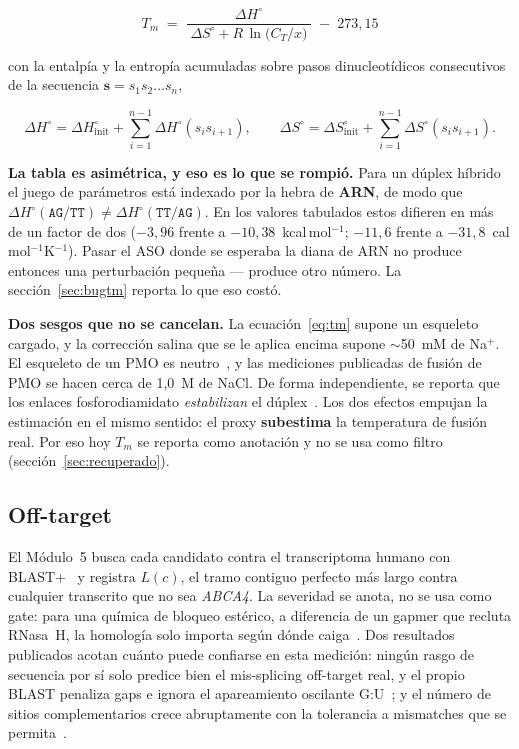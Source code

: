 \documentclass[11pt,a4paper]{article}
\begin{document}
\begin{equation}
T_m \;=\; \frac{\Delta H^\circ}{\;\Delta S^\circ + R\,\ln\!\bigl(C_T/x\bigr)\;} \;-\; 273{,}15
\label{eq:tm}
\end{equation}

con la entalpía y la entropía acumuladas sobre pasos dinucleotídicos consecutivos de la secuencia
$\bm{s}=s_1s_2\ldots s_n$,

\begin{equation}
\Delta H^\circ = \Delta H^\circ_{\mathrm{init}} + \sum_{i=1}^{n-1} \Delta H^\circ(s_i s_{i+1}),
\qquad
\Delta S^\circ = \Delta S^\circ_{\mathrm{init}} + \sum_{i=1}^{n-1} \Delta S^\circ(s_i s_{i+1}).
\label{eq:nn}
\end{equation}

\textbf{La tabla es asimétrica, y eso es lo que se rompió.} Para un dúplex híbrido el juego de
parámetros está indexado por la hebra de \textbf{ARN}, de modo que
$\Delta H^\circ(\mathtt{AG/TT}) \neq \Delta H^\circ(\mathtt{TT/AG})$. En los valores tabulados estos
difieren en más de un factor de dos ($-3{,}96$ frente a $-10{,}38$~kcal\,mol$^{-1}$; $-11{,}6$
frente a $-31{,}8$~cal\,mol$^{-1}$K$^{-1}$). Pasar el ASO donde se esperaba la diana de ARN no
produce entonces una perturbación pequeña --- produce otro número. La
sección~\ref{sec:bugtm} reporta lo que eso costó.

\textbf{Dos sesgos que no se cancelan.} La ecuación~\ref{eq:tm} supone un esqueleto cargado, y la
corrección salina que se le aplica encima supone $\sim$50~mM de Na$^+$. El esqueleto de un PMO es
neutro~\cite{summerton1997}, y las mediciones publicadas de fusión de PMO se hacen cerca de 1,0~M de
NaCl. De forma independiente, se reporta que los enlaces fosforodiamidato \emph{estabilizan} el
dúplex~\cite{maksudov2023}. Los dos efectos empujan la estimación en el mismo sentido: el proxy
\textbf{subestima} la temperatura de fusión real. Por eso hoy $T_m$ se reporta como anotación y no
se usa como filtro (sección~\ref{sec:recuperado}).

\subsection{Off-target}

El Módulo~5 busca cada candidato contra el transcriptoma humano con BLAST+~\cite{camacho2009} y
registra $L(c)$, el tramo contiguo perfecto más largo contra cualquier transcrito que no sea
\emph{ABCA4}. La severidad se anota, no se usa como gate: para una química de bloqueo estérico, a
diferencia de un gapmer que recluta RNasa~H, la homología solo importa según dónde
caiga~\cite{dhuri2020}. Dos resultados publicados acotan cuánto puede confiarse en esta medición:
ningún rasgo de secuencia por sí solo predice bien el mis-splicing off-target real, y el propio
BLAST penaliza gaps e ignora el apareamiento oscilante G:U~\cite{scharner2020}; y el número de
sitios complementarios crece abruptamente con la tolerancia a mismatches que se
permita~\cite{yoshida2018}.
\end{document}
